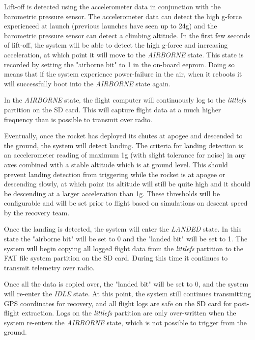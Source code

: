 Lift-off is detected using the accelerometer data in conjunction with the barometric pressure sensor. The accelerometer
data can detect the high g-force experienced at launch (previous launches have seen up to 24g) and the barometric
pressure sensor can detect a climbing altitude. In the first few seconds of lift-off, the system will be able to detect
the high g-force and increasing acceleration, at which point it will move to the \textit{AIRBORNE} state. This state is
recorded by setting the "airborne bit" to 1 in the on-board \gls{eeprom}. Doing so means that if the system experience
power-failure in the air, when it reboots it will successfully boot into the \textit{AIRBORNE} state again.

In the \textit{AIRBORNE} state, the flight computer will continuously log to the \textit{littlefs} partition on the SD
card. This will capture flight data at a much higher frequency than is possible to transmit over radio.

Eventually, once the rocket has deployed its chutes at apogee and descended to the ground, the system will detect
landing. The criteria for landing detection is an accelerometer reading of maximum 1g (with slight tolerance for noise)
in any axes combined with a stable altitude which is at ground level. This should prevent landing detection from
triggering while the rocket is at apogee or descending slowly, at which point its altitude will still be quite high and
it should be descending at a larger acceleration than 1g. These thresholds will be configurable and will be set prior
to flight based on simulations on descent speed by the recovery team.

Once the landing is detected, the system will enter the \textit{LANDED} state. In this state the "airborne bit" will be
set to 0 and the "landed bit" will be set to 1. The system will begin copying all logged flight data from the
\textit{littlefs} partition to the FAT file system partition on the SD card. During this time it continues to transmit
telemetry over radio.

Once all the data is copied over, the "landed bit" will be set to 0, and the system will re-enter the \textit{IDLE}
state. At this point, the system still continues transmitting GPS coordinates for recovery, and all flight logs are
safe on the SD card for post-flight extraction. Logs on the \textit{littlefs} partition are only over-written when the
system re-enters the \textit{AIRBORNE} state, which is not possible to trigger from the ground.

